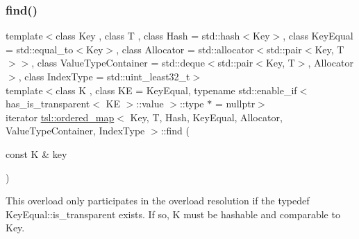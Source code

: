 \subsubsection{\texorpdfstring{find()}{find()}\hspace{0.1cm}{\footnotesize\ttfamily [3/6]}}
{\footnotesize\ttfamily template$<$class Key , class T , class Hash  = std\+::hash$<$\+Key$>$, class Key\+Equal  = std\+::equal\+\_\+to$<$\+Key$>$, class Allocator  = std\+::allocator$<$std\+::pair$<$\+Key, T$>$$>$, class Value\+Type\+Container  = std\+::deque$<$std\+::pair$<$\+Key, T$>$, Allocator$>$, class Index\+Type  = std\+::uint\+\_\+least32\+\_\+t$>$ \\
template$<$class K , class KE  = Key\+Equal, typename std\+::enable\+\_\+if$<$ has\+\_\+is\+\_\+transparent$<$ K\+E $>$\+::value $>$\+::type $\ast$  = nullptr$>$ \\
iterator \mbox{\hyperlink{classtsl_1_1ordered__map}{tsl\+::ordered\+\_\+map}}$<$ Key, T, Hash, Key\+Equal, Allocator, Value\+Type\+Container, Index\+Type $>$\+::find (\begin{DoxyParamCaption}\item[{const K \&}]{key }\end{DoxyParamCaption})\hspace{0.3cm}{\ttfamily [inline]}}

This overload only participates in the overload resolution if the typedef Key\+Equal\+::is\+\_\+transparent exists. If so, K must be hashable and comparable to Key. \mbox{\label{classtsl_1_1ordered__map_a98ecf180c88d8cc7a71573607d86b50f}} 
